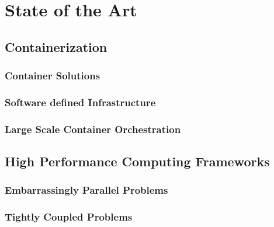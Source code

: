 \chapter{State of the Art}
\label{State_of_the_Art}

\section{Containerization}


    \subsection*{Container Solutions}
    \subsection*{Software defined Infrastructure}
    \subsection*{Large Scale Container Orchestration}
    

\section{High Performance Computing Frameworks}


   \subsection{Embarrassingly Parallel Problems}

   \subsection{Tightly Coupled Problems}

